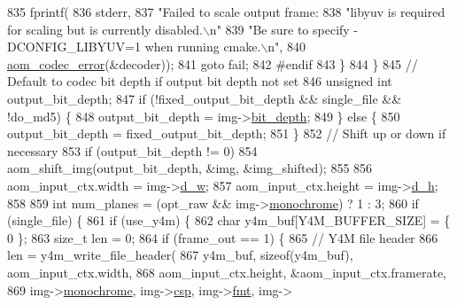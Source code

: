 \begin{DoxyCodeInclude}
{{{{{{{{{{{{{{{{{{{{{{{{{{{{{{{{{{{{{{{{{{{{{835             fprintf(
836                 stderr,
837                 \textcolor{stringliteral}{"Failed to scale output frame: %
838                 \textcolor{stringliteral}{"libyuv is required for scaling but is currently disabled.\(\backslash\)n"}
839                 \textcolor{stringliteral}{"Be sure to specify -DCONFIG\_LIBYUV=1 when running cmake.\(\backslash\)n"},
840                 \hyperlink{group__codec_ga50949c0854605c722832bbfb0803f5f4}{aom\_codec\_error}(&decoder));
841             \textcolor{keywordflow}{goto} fail;
842 \textcolor{preprocessor}{#endif}
843           \}
844         \}
845         \textcolor{comment}{// Default to codec bit depth if output bit depth not set}
846         \textcolor{keywordtype}{unsigned} \textcolor{keywordtype}{int} output\_bit\_depth;
847         \textcolor{keywordflow}{if} (!fixed\_output\_bit\_depth && single\_file && !do\_md5) \{
848           output\_bit\_depth = img->\hyperlink{structaom__image_a46ed9ffd741938d306a0db5a24bdcf8e}{bit\_depth};
849         \} \textcolor{keywordflow}{else} \{
850           output\_bit\_depth = fixed\_output\_bit\_depth;
851         \}
852         \textcolor{comment}{// Shift up or down if necessary}
853         \textcolor{keywordflow}{if} (output\_bit\_depth != 0)
854           aom\_shift\_img(output\_bit\_depth, &img, &img\_shifted);
855 
856         aom\_input\_ctx.width = img->\hyperlink{structaom__image_a89f80b1f58d608b9d2080635f4359034}{d\_w};
857         aom\_input\_ctx.height = img->\hyperlink{structaom__image_ab986419a1f0fff93a2dc505f47194988}{d\_h};
858 
859         \textcolor{keywordtype}{int} num\_planes = (opt\_raw && img->\hyperlink{structaom__image_ab7886616025ff8bd0bb96d967fca9ad8}{monochrome}) ? 1 : 3;
860         \textcolor{keywordflow}{if} (single\_file) \{
861           \textcolor{keywordflow}{if} (use\_y4m) \{
862             \textcolor{keywordtype}{char} y4m\_buf[Y4M\_BUFFER\_SIZE] = \{ 0 \};
863             \textcolor{keywordtype}{size\_t} len = 0;
864             \textcolor{keywordflow}{if} (frame\_out == 1) \{
865               \textcolor{comment}{// Y4M file header}
866               len = y4m\_write\_file\_header(
867                   y4m\_buf, \textcolor{keyword}{sizeof}(y4m\_buf), aom\_input\_ctx.width,
868                   aom\_input\_ctx.height, &aom\_input\_ctx.framerate,
869                   img->\hyperlink{structaom__image_ab7886616025ff8bd0bb96d967fca9ad8}{monochrome}, img->\hyperlink{structaom__image_a4f235c521bc95a061e9e0b2a3d5d457e}{csp}, img->\hyperlink{structaom__image_a6c64b1ab918d80d52eb8f5d6d957e825}{fmt}, img->
}}}}}}}}}}}}}}}}}}}}}}}}}}}}}}}}}}}}}}}}}}}}}}
\end{DoxyCodeInclude}
